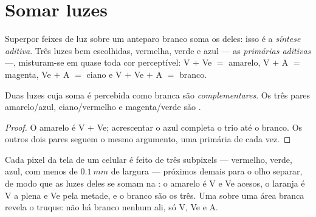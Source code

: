 \section{Somar luzes}

\begin{definition}\label{def:g11:color-light-sources:additive}
Superpor feixes de luz sobre um anteparo branco soma os  deles:
isso é a \emph{síntese aditiva}. Três luzes bem
escolhidas, vermelha, verde e azul --- as \emph{primárias
aditivas} ---, misturam-se em quase toda cor
perceptível: V $+$ Ve $=$ amarelo, V $+$ A $=$ magenta, Ve $+$ A $=$
ciano e V $+$ Ve $+$ A $=$ branco.
\end{definition}

\begin{proposition}\label{prop:g11:color-light-sources:complementary}
Duas luzes cuja soma é percebida como branca são
\emph{complementares}. Os três pares
amarelo/azul, ciano/vermelho e magenta/verde são .
\end{proposition}

\begin{proof}
O amarelo é V $+$ Ve; acrescentar o azul completa o trio até o branco. Os
outros dois pares seguem o mesmo argumento, uma primária de cada vez.
\end{proof}

\begin{example}[Telas]\label{ex:g11:color-light-sources:screen}
Cada pixel da tela de um celular é feito de três subpixels ---
vermelho, verde, azul, com menos de $\qty{0.1}{mm}$ de largura ---
próximos demais para o olho separar, de modo que as luzes deles se somam
na : o amarelo é V e Ve acesos, o laranja é V a plena  e Ve
pela metade, e o branco são os três. Uma  sobre uma área branca
revela o truque: não há branco nenhum ali, só V, Ve e A.
\end{example}

